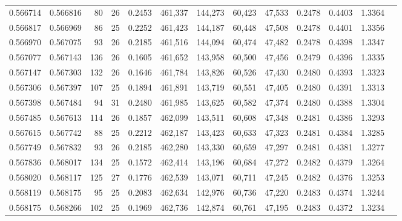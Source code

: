 \begin{tabular}{rrrrrrrrrrrrr}
0.566714 & 0.566816 &  80 &  26 &                                     0.2453 & 461,337 & 144,273 &  60,423 &  47,533 & 0.2478 & 0.4403 & 1.3364 \\
0.566817 & 0.566969 &  86 &  25 &                                     0.2252 & 461,423 & 144,187 &  60,448 &  47,508 & 0.2478 & 0.4401 & 1.3356 \\
0.566970 & 0.567075 &  93 &  26 &                                     0.2185 & 461,516 & 144,094 &  60,474 &  47,482 & 0.2478 & 0.4398 & 1.3347 \\
0.567077 & 0.567143 & 136 &  26 &                                     0.1605 & 461,652 & 143,958 &  60,500 &  47,456 & 0.2479 & 0.4396 & 1.3335 \\
0.567147 & 0.567303 & 132 &  26 &                                     0.1646 & 461,784 & 143,826 &  60,526 &  47,430 & 0.2480 & 0.4393 & 1.3323 \\
0.567306 & 0.567397 & 107 &  25 &                                     0.1894 & 461,891 & 143,719 &  60,551 &  47,405 & 0.2480 & 0.4391 & 1.3313 \\
0.567398 & 0.567484 &  94 &  31 &                                     0.2480 & 461,985 & 143,625 &  60,582 &  47,374 & 0.2480 & 0.4388 & 1.3304 \\
0.567485 & 0.567613 & 114 &  26 &                                     0.1857 & 462,099 & 143,511 &  60,608 &  47,348 & 0.2481 & 0.4386 & 1.3293 \\
0.567615 & 0.567742 &  88 &  25 &                                     0.2212 & 462,187 & 143,423 &  60,633 &  47,323 & 0.2481 & 0.4384 & 1.3285 \\
0.567749 & 0.567832 &  93 &  26 &                                     0.2185 & 462,280 & 143,330 &  60,659 &  47,297 & 0.2481 & 0.4381 & 1.3277 \\
0.567836 & 0.568017 & 134 &  25 &                                     0.1572 & 462,414 & 143,196 &  60,684 &  47,272 & 0.2482 & 0.4379 & 1.3264 \\
0.568020 & 0.568117 & 125 &  27 &                                     0.1776 & 462,539 & 143,071 &  60,711 &  47,245 & 0.2482 & 0.4376 & 1.3253 \\
0.568119 & 0.568175 &  95 &  25 &                                     0.2083 & 462,634 & 142,976 &  60,736 &  47,220 & 0.2483 & 0.4374 & 1.3244 \\
0.568175 & 0.568266 & 102 &  25 &                                     0.1969 & 462,736 & 142,874 &  60,761 &  47,195 & 0.2483 & 0.4372 & 1.3234 \\

\end{tabular}
